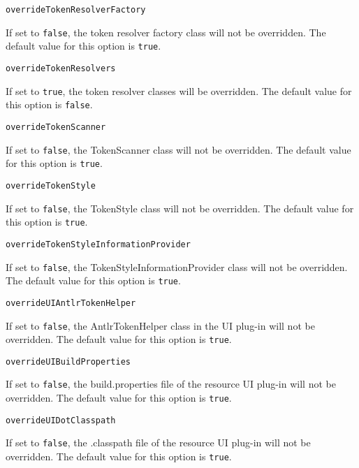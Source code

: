 \noindent\texttt{overrideTokenResolverFactory}
\begin{myindentpar}{1cm}
If set to \texttt{false}, the token resolver factory class will not be overridden. The default value for this option is \texttt{true}.
\end{myindentpar}

\noindent\texttt{overrideTokenResolvers}
\begin{myindentpar}{1cm}
If set to \texttt{true}, the token resolver classes will be overridden. The default value for this option is \texttt{false}.
\end{myindentpar}

\noindent\texttt{overrideTokenScanner}
\begin{myindentpar}{1cm}
If set to \texttt{false}, the TokenScanner class will not be overridden. The default value for this option is \texttt{true}.
\end{myindentpar}

\noindent\texttt{overrideTokenStyle}
\begin{myindentpar}{1cm}
If set to \texttt{false}, the TokenStyle class will not be overridden. The default value for this option is \texttt{true}.
\end{myindentpar}

\noindent\texttt{overrideTokenStyleInformationProvider}
\begin{myindentpar}{1cm}
If set to \texttt{false}, the TokenStyleInformationProvider class will not be overridden. The default value for this option is \texttt{true}.
\end{myindentpar}

\noindent\texttt{overrideUIAntlrTokenHelper}
\begin{myindentpar}{1cm}
If set to \texttt{false}, the AntlrTokenHelper class in the UI plug-in will not be overridden. The default value for this option is \texttt{true}.
\end{myindentpar}

\noindent\texttt{overrideUIBuildProperties}
\begin{myindentpar}{1cm}
If set to \texttt{false}, the build.properties file of the resource UI plug-in will not be overridden. The default value for this option is \texttt{true}.
\end{myindentpar}

\noindent\texttt{overrideUIDotClasspath}
\begin{myindentpar}{1cm}
If set to \texttt{false}, the .classpath file of the resource UI plug-in will not be overridden. The default value for this option is \texttt{true}.
\end{myindentpar}

